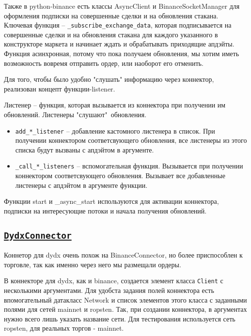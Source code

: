 Также в python-binance есть классы AsyncClient и BinanceSocketManager для оформления подписки на совершенные сделки и на обновления стакана. Ключевая функция -- \texttt{\_subscribe\_exchange\_data}, которая подписывается на совершенные сделки и на обновления стакана для каждого указанного в конструкторе маркета и начинает ждать и обрабатывать приходящие апдэйты. Функция асинхронная, потому что пока получаем обновления, мы хотим иметь возможность вовремя отправить ордер, или наоборот его отменить.

Для того, чтобы было удобно "слушать" информацию через коннектор, реализован концепт функции-listener.

\begin{designation}
Листенер -- функция, которая вызывается из коннектора при получении им обновлений. Листенеры "слушают"\ обновления.
\end{designation}

\begin{itemize}
    \item \texttt{add\_*\_listener} -- добавление кастомного листенера в список. При получении коннектором соответсвующего обновления, все листенеры из этого списка будут вызваны с апдэйтом в аргументе.
    \item \texttt{\_call\_*\_listeners} -- вспомогательная функция. Вызывается при получении коннектором соответсвующего обновления. Вызывает все добавленные листенеры с апдэйтом в аргументе функции.
\end{itemize}

Функции start и \_async\_start используются для активации коннектора, подписки на интересующие потоки и начала получения обновлений.

\subsection{\href{https://github.com/dexety/dex-trading-system/blob/main/connectors/dydx/connector.py}{\texttt{DydxConnector}}}

Коннетор для dydx очень похож на BinanceConnector, но более приспособлен к торговле, так как именно через него мы размещали ордеры.

 В коннекторе для dydx, как и binance, создается элемент класса \texttt{Client} с несколькими аргументами. Для удобста задания полей коннектора есть впомогательный датакласс Network и список элементов этого класса с заданными полями для сетей mainnet и ropsten. Так, при создании коннектора, в аргументах нужно всего лишь указать название сети. Для тестирования используется сеть ropsten, для реальных торгов - mainnet.

